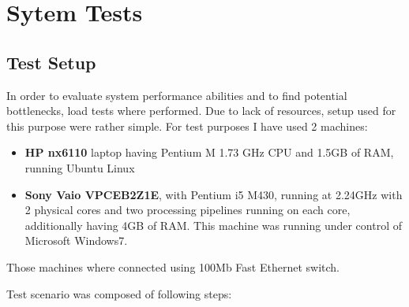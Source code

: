 %


\section{Sytem Tests}
\label{sec:ch7_tests}

\subsection{Test Setup}

In order to evaluate system performance abilities and to find potential bottlenecks, load tests where performed. Due to lack of resources, setup used for this purpose were rather simple. For test purposes I have used 2 machines: 

\begin{itemize}
\item {\bf HP nx6110} laptop having Pentium M 1.73 GHz CPU and 1.5GB of RAM, running Ubuntu Linux
\item {\bf Sony Vaio VPCEB2Z1E}, with Pentium i5 M430, running at 2.24GHz with 2 physical cores and two processing pipelines running on each core, additionally having 4GB of RAM. This machine was running under control of Microsoft Windows7.
\end{itemize}

Those machines where connected using 100Mb Fast Ethernet switch.

Test scenario was composed of following steps:


